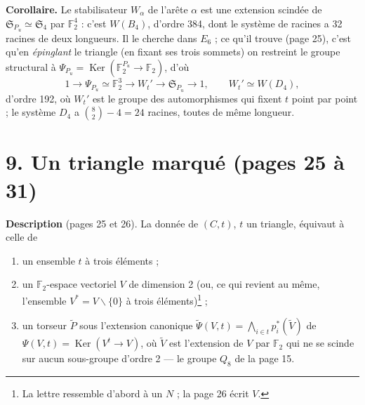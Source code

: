 \documentclass[11pt,a4paper]{article}
\begin{document}
\textbf{Corollaire.} Le stabilisateur $W_\alpha$ de l'arête $\alpha$ est une
extension scindée de $\mathfrak{S}_{P_u} \simeq \mathfrak{S}_4$ par
$\mathbb{F}_2^4$ : c'est $W(B_4)$, d'ordre 384, dont le système de racines a
32 racines de deux longueurs. Il le cherche dans $E_6$ ; ce qu'il trouve
(page 25), c'est qu'en \emph{épinglant} le triangle (en fixant ses trois
sommets) on restreint le groupe structural à $\Psi_{P_u} = \operatorname{Ker}(
\mathbb{F}_2^{P_u} \to \mathbb{F}_2)$, d'où
\[
1 \to \Psi_{P_u} \simeq \mathbb{F}_2^3 \to W_t' \to \mathfrak{S}_{P_u} \to 1,
\qquad W_t' \simeq W(D_4),
\]
d'ordre 192, où $W_t'$ est le groupe des automorphismes qui fixent $t$ point
par point ; le système $D_4$ a $\binom 82 - 4 = 24$ racines, toutes de même
longueur.

\section*{9. Un triangle marqué (pages 25 à 31)}

\textbf{Description} (pages 25 et 26). La donnée de $(C, t)$, $t$ un triangle,
équivaut à celle de

\begin{enumerate}
\item[a)] un ensemble $t$ à trois éléments ;
\item[b)] un $\mathbb{F}_2$-espace vectoriel $V$ de dimension 2 (ou, ce qui
  revient au même, l'ensemble $V^* = V \smallsetminus \lbrace 0\rbrace$ à trois
  éléments)\footnote{La lettre ressemble d'abord à un $N$ ; la page 26 écrit
  $V$.} ;
\item[c)] un torseur $\widetilde P$ sous l'extension canonique
  $\widetilde\Psi(V, t) = \bigwedge_{i \in t} p_i^*(\widetilde V)$ de
  $\Psi(V, t) = \operatorname{Ker}(V^t \to V)$, où $\widetilde V$ est
  l'extension de $V$ par $\mathbb{F}_2$ qui ne se scinde sur aucun sous-groupe
  d'ordre 2 --- le groupe $Q_8$ de la page 15.
\end{enumerate}
\end{document}
